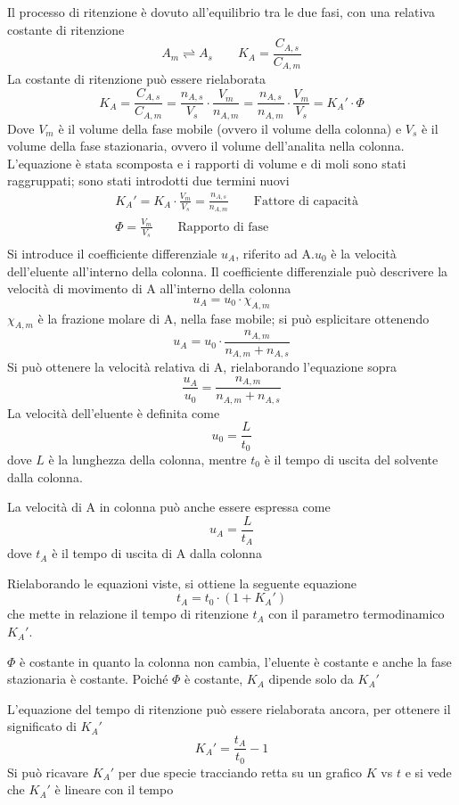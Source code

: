 Il processo di ritenzione è dovuto all'equilibrio tra le due fasi, con una relativa costante di ritenzione
\[
A_m \rightleftharpoons A_s \qquad K_A = \frac{C_{A,s}}{C_{A,m}}
\]
La costante di ritenzione può essere rielaborata
\[
K_A = \frac{C_{A,s}}{C_{A,m}} = \frac{n_{A,s}}{V_s} \cdot \frac{V_m}{n_{A,m}} = \frac{n_{A,s}}{n_{A,m}} \cdot \frac{V_m}{V_s} = K_A' \cdot \Phi
\]
Dove $V_m$ è il volume della fase mobile (ovvero il volume della colonna) e $V_s$ è il volume della fase stazionaria, ovvero il volume dell'analita nella colonna.
L'equazione è stata scomposta e i rapporti di volume e di moli sono stati raggruppati; sono stati introdotti due termini nuovi
\begin{align*}
& K_A' = K_A \cdot \frac{V_m}{V_s} = \frac{n_{A,s}}{n_{A,m}} \qquad \text{Fattore di capacità}\\
& \Phi = \frac{V_m}{V_s} \qquad \text{Rapporto di fase}\\
\end{align*}
Si introduce il coefficiente differenziale $u_A$, riferito ad A.$u_0$ è la velocità dell'eluente all'interno della colonna.
Il coefficiente differenziale può descrivere la velocità di movimento di A all'interno della colonna
\[
u_A = u_0 \cdot \chi_{A,m}
\]
$\chi_{A,m}$ è la frazione molare di A, nella fase mobile; si può esplicitare ottenendo
\[
u_A = u_0 \cdot \frac{n_{A,m}}{n_{A,m} + n_{A,s}}
\]
Si può ottenere la velocità relativa di A, rielaborando l'equazione sopra
\[
\frac{u_A}{u_0 } = \frac{n_{A,m}}{n_{A,m} + n_{A,s}}
\]
La velocità dell'eluente è definita come
\[
u_0 = \frac{L}{t_0}
\]
dove $L$ è la lunghezza della colonna, mentre $t_0$ è il tempo di uscita del solvente dalla colonna.\par
La velocità di A in colonna può anche essere espressa come
\[
u_A = \frac{L}{t_A}
\]
dove $t_A$ è il tempo di uscita di A dalla colonna

Rielaborando le equazioni viste, si ottiene la seguente equazione
\[
t_A = t_0 \cdot (1 + K_A')
\]
che mette in relazione il tempo di ritenzione $t_A$ con il parametro termodinamico $K_A'$.\par
$\Phi$ è costante in quanto la colonna non cambia, l'eluente è costante e anche la fase stazionaria è costante. Poiché $\Phi$ è costante, $K_A$ dipende solo da $K_A'$

L'equazione del tempo di ritenzione può essere rielaborata ancora, per ottenere il significato di $K_A'$
\[
K_A' = \frac{t_A}{t_0} - 1
\]
Si può ricavare $K_A'$ per due specie tracciando retta su un grafico $K$ vs $t$ e si vede che $K_A'$ è lineare con il tempo


